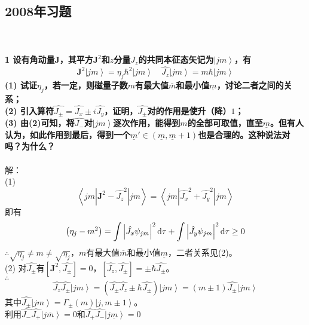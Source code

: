 \documentclass[12pt]{article}
\numberwithin{equation}{section}	 %
\begin{document}
\begin{spacing}{1.5}
\subsection{2008年习题}
~\\
~\\
\textbf{1 \quad 设有角动量$\bm J$，其平方$\bm J^{2}$和$z$分量$J_{z}$的共同本征态矢记为$\left| jm \right>$，有
\begin{equation}
\bm{J}^{2}\left|jm\right>=\eta_{j}\hbar^{2}\left|jm\right> \quad \hat{J_{z}}\left|jm\right>=m\hbar\left|jm\right>
\end{equation}
(1) 试证$\eta_{j}$，若一定，则磁量子数$m$有最大值$\overline{m}$和最小值$\underline{m}$，讨论二者之间的关系；\\
(2) 引入算符$\displaystyle \hat{J_{\pm}}=\hat{J_{x}} \pm i\hat{J_{y}}$，证明，$\hat{J_{\pm}}$对的作用是使升（降）$1$；\\
(3) 由(2)可知，将$\hat{J_{-}}$对$\left| jm \right>$逐次作用，能得到$m$的全部可取值，直至$\underline{m}$。但有人认为，如此作用到最后，得到一个$\underline{m}' \in (\underline{m},\underline{m}+1)$也是合理的。这种说法对吗？为什么？
}\\
~\\
解：\\
(1) 
\begin{equation}
\left<jm\left|\bm{J}^{2} - \hat{J_{z}}^{2}\right|jm\right> = \left<jm\left|\hat{J_{x}}^{2}+\hat{J_{y}}^{2}\right|jm\right>
\end{equation}
即有
\begin{equation}
\left( \eta_{j}-m^{2} \right) = \int\left|\hat{J_{x}}\psi_{jm}\right|^{2}\mathop{}\!\mathrm{d}\tau + \int\left|\hat{J_{y}}\psi_{jm}\right|^{2}\mathop{}\!\mathrm{d}\tau \ge 0
\end{equation}
$\therefore \displaystyle \sqrt{\eta_{j}} \ne m \ne \sqrt{\eta_{j}}$，$m$有最大值$\overline{m}$和最小值$\underline{m}$，二者关系见(2)。\\
(2) 对$\hat{J_{\pm}}$有$\displaystyle \left[\bm{J}^{2},\hat{J_{\pm}}\right]=0$，$\displaystyle \left[\hat{J_{z}},\hat{J_{\pm}}\right]=\pm\hbar\hat{J_{\pm}}$。\\
$\therefore$
\begin{equation}
\hat{J_{z}}\hat{J_{\pm}}\left|jm\right> = \left(\hat{J_{\pm}}\hat{J_{z}}\pm\hbar\hat{J_{\pm}}\right)\left|jm\right> = \left(m\pm1\right)\hat{J_{\pm}}\left|jm\right>
\end{equation}
其中$\displaystyle \hat{J_{\pm}}\left|jm\right> = \Gamma_{\pm}(m)\left|j,m\pm1\right>$。\\
利用$\hat{J_{-}}\hat{J_{+}}\left|j\overline{m}\right>=0$和$\hat{J_{+}}\hat{J_{-}}\left|j\underline{m}\right>=0$ \\

\end{spacing}
\end{document}
